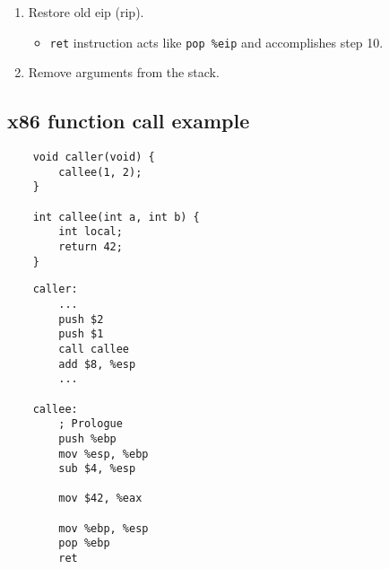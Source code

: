 \begin{enumerate}
    \item Restore old eip (rip).
    \begin{itemize}
        \item \texttt{ret} instruction acts like \texttt{pop \%eip} and accomplishes step 10.
    \end{itemize}
    
    \item Remove arguments from the stack.
\end{enumerate}

\subsection{x86 function call example}
\begin{multicols}{2}
	\begin{verbatim}
    void caller(void) {
        callee(1, 2);
    }
    
    int callee(int a, int b) {
        int local;
        return 42;
    }
	\end{verbatim}
	
	\columnbreak
	
	\begin{verbatim}
	caller:
    	...
    	push $2
    	push $1
    	call callee
    	add $8, %esp
    	...
	
	callee:
    	; Prologue
    	push %ebp
    	mov %esp, %ebp
    	sub $4, %esp
    	
    	mov $42, %eax
    	
    	mov %ebp, %esp
    	pop %ebp
    	ret
	\end{verbatim}
\end{multicols}